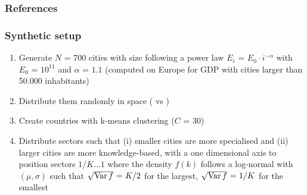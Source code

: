 \begin{frame}[allowframebreaks]
\frametitle{References}


\end{frame}







\begin{frame}[label=syntheticsetup]

\frametitle{Synthetic setup}

\begin{enumerate}
    \item Generate $N \textrm{ = } 700$ cities with size following a power law $E_i \textrm{ = } E_0 \cdot i^{-\alpha}$ with $E_0 \textrm{ = } 10^{11}$ and $\alpha \textrm{ = } 1.1$ (computed on Europe for GDP with cities larger than 50.000 inhabitants)
    \item Distribute them randomly in space (\cite{simini2019testing} vs \cite{banos2011christaller})
    \item Create countries with k-means clustering ($C \textrm{ = } 30$)
    \item Distribute sectors such that (i) smaller cities are more specialised and (ii) larger cities are more knowledge-based, with a one dimensional axis to position sectors $1/K \ldots 1$ where the density $f\left(k\right)$ follows a log-normal with $\left(\mu,\sigma\right)$ such that $\sqrt{\operatorname{Var} f} \textrm{ = } K/2$ for the largest, $\sqrt{\operatorname{Var} f} \textrm{ = } 1/K$ for the smallest %
\end{enumerate}

\hyperlink{setupmain}{}

\end{frame}



